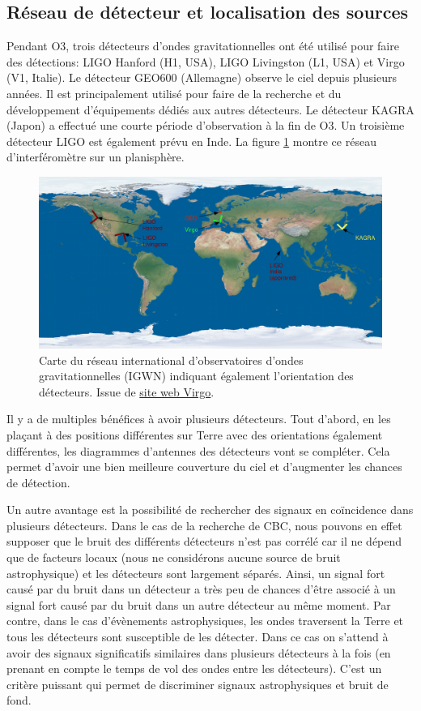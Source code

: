 \clearpage \newpage
\subsection{Réseau de détecteur et localisation des sources}
\label{sec:network}

Pendant O3, trois détecteurs d'ondes gravitationnelles ont été utilisé pour faire des détections: LIGO Hanford (H1, USA), LIGO Livingston (L1, USA) et Virgo (V1, Italie).
Le détecteur GEO600 (Allemagne) observe le ciel depuis plusieurs années.
Il est principalement utilisé pour faire de la recherche et du développement d'équipements dédiés aux autres détecteurs.
Le détecteur KAGRA (Japon) a effectué une courte période d'observation à la fin de O3.
Un troisième détecteur LIGO est également prévu en Inde.
La figure \ref{fig:igwn} montre ce réseau d'interféromètre sur un planisphère.
%
\begin{figure}
  \centering
  \includegraphics[width=0.8\linewidth]{sectionDetection/itf_network.png}
  \caption{Carte du réseau international d'observatoires d'ondes gravitationnelles (IGWN) indiquant également l'orientation des détecteurs. Issue de \href{http://public.virgo-gw.eu/a-worldwide-network/}{site web Virgo}.}
  \label{fig:igwn}
\end{figure}
%

Il y a de multiples bénéfices à avoir plusieurs détecteurs.
Tout d'abord, en les plaçant à des positions différentes sur Terre avec des orientations également différentes, les diagrammes d'antennes des détecteurs vont se compléter.
Cela permet d'avoir une bien meilleure couverture du ciel et d'augmenter les chances de détection.

Un autre avantage est la possibilité de rechercher des signaux en coïncidence dans plusieurs détecteurs.
Dans le cas de la recherche de CBC, nous pouvons en effet supposer que le bruit des différents détecteurs n'est pas corrélé car il ne dépend que de facteurs locaux (nous ne considérons aucune source de bruit astrophysique) et les détecteurs sont largement séparés.
Ainsi, un signal fort causé par du bruit dans un détecteur a très peu de chances d'être associé à un signal fort causé par du bruit dans un autre détecteur au même moment.
Par contre, dans le cas d'évènements astrophysiques, les ondes traversent la Terre et tous les détecteurs sont susceptible de les détecter.
Dans ce cas on s'attend à avoir des signaux significatifs similaires dans plusieurs détecteurs à la fois (en prenant en compte le temps de vol des ondes entre les détecteurs).
C'est un critère puissant qui permet de discriminer signaux astrophysiques et bruit de fond.

